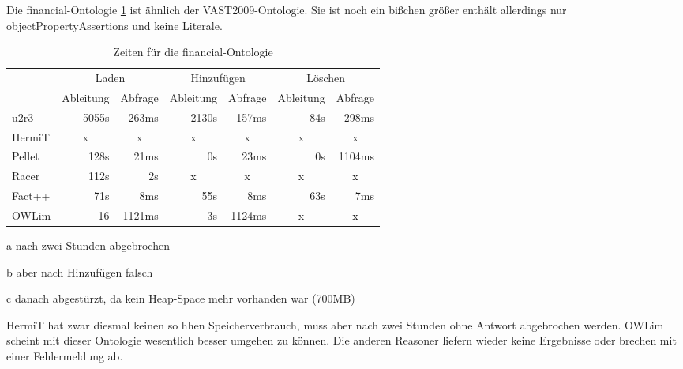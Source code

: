 Die financial-Ontologie \ref{table-time-financial} ist ähnlich der VAST2009-Ontologie. Sie ist noch ein bißchen größer enthält allerdings nur objectPropertyAssertions und keine Literale.

\begin{table}[htbp]
\caption{Zeiten für die financial-Ontologie}
\label{table-time-financial}
\begin{center}
\begin{threeparttable}
\begin{tabular}{l|r|r|r|r|r|r|}
\cline{2-7}
 & \multicolumn{2}{|c|}{Laden} & \multicolumn{2}{|c|}{Hinzufügen} & \multicolumn{2}{|c|}{Löschen} \\
\cline{2-7}
 & \multicolumn{1}{|c|}{Ableitung} & \multicolumn{1}{|c|}{Abfrage} & \multicolumn{1}{|c|}{Ableitung} & \multicolumn{1}{|c|}{Abfrage} & \multicolumn{1}{|c|}{Ableitung} & \multicolumn{1}{|c|}{Abfrage} \\
\hline
\multicolumn{1}{|l|}{u2r3} & 5055s & 263ms & 2130s & 157ms & 84s & 298ms \\ \hline
\multicolumn{1}{|l|}{HermiT\tnote{a}} & \multicolumn{1}{c|}{x} & \multicolumn{1}{c|}{x} & \multicolumn{1}{c|}{x} & \multicolumn{1}{c|}{x} & \multicolumn{1}{c|}{x} & \multicolumn{1}{c|}{x} \\ \hline
\multicolumn{1}{|l|}{Pellet\tnote{b}} & 128s & 21ms & 0s & 23ms & 0s & 1104ms \\ \hline
\multicolumn{1}{|l|}{Racer\tnote{c}} & 112s & 2s & \multicolumn{1}{c|}{x} & \multicolumn{1}{c|}{x} & \multicolumn{1}{c|}{x} & \multicolumn{1}{c|}{x} \\ \hline
\multicolumn{1}{|l|}{Fact++} & 71s & 8ms & 55s & 8ms & 63s & 7ms \\ \hline
\multicolumn{1}{|l|}{OWLim} & 16 & 1121ms & 3s & 1124ms & \multicolumn{1}{c|}{x} & \multicolumn{1}{c|}{x} \\ \hline
\end{tabular}
\begin{tablenotes}
	\item[a] nach zwei Stunden abgebrochen
	\item[b] aber nach Hinzufügen falsch
	\item[c] danach abgestürzt, da kein Heap-Space mehr vorhanden war (700MB)
\end{tablenotes}
\end{threeparttable}
\end{center}
\end{table}

HermiT hat zwar diesmal keinen so hhen Speicherverbrauch, muss aber nach zwei Stunden ohne Antwort abgebrochen werden. OWLim scheint mit dieser Ontologie wesentlich besser umgehen zu können. Die anderen Reasoner liefern wieder keine Ergebnisse oder brechen mit einer Fehlermeldung ab.

